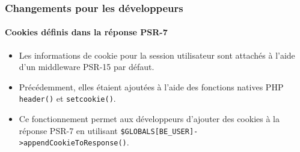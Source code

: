 %

\begin{frame}[fragile]
	\frametitle{Changements pour les développeurs}
	\framesubtitle{Cookies définis dans la réponse PSR-7}

	\begin{itemize}
		\item Les informations de cookie pour la session utilisateur sont attachés à
			l'aide d'un middleware PSR-15 par défaut.
		\item Précédemment, elles étaient ajoutées à l'aide des fonctions natives PHP \newline
			\smaller\texttt{header()} et \texttt{setcookie()}\normalsize.
		\item Ce fonctionnement permet aux développeurs d'ajouter des cookies à la réponse PSR-7
			en utilisant\newline
			\smaller\texttt{\$GLOBALS[BE\_USER]->appendCookieToResponse()}\normalsize.
	\end{itemize}
\end{frame}

